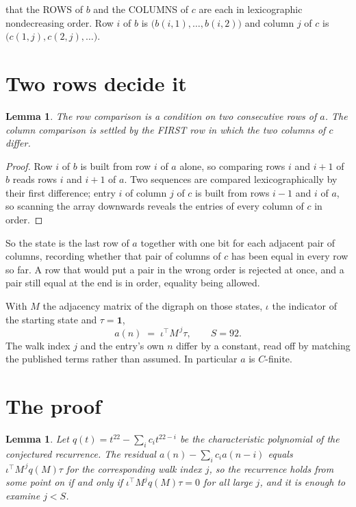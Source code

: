 \documentclass[11pt,a4paper]{article}
\theoremstyle{plain}
\newtheorem{lemma}[theorem]{Lemma}
\theoremstyle{definition}
\begin{document}
that the ROWS of $b$ and the COLUMNS of $c$ are each in lexicographic nondecreasing order. Row $i$ of $b$
is $\bigl(b(i,1),\dots,b(i,2)\bigr)$ and column $j$ of $c$ is
$\bigl(c(1,j),c(2,j),\dots\bigr)$.


\section{Two rows decide it}

\begin{lemma}\label{lem:win}
The row comparison is a condition on two consecutive rows of $a$. The column comparison is
settled by the FIRST row in which the two columns of $c$ differ.
\end{lemma}

\begin{proof}
Row $i$ of $b$ is built from row $i$ of $a$ alone, so comparing rows $i$ and $i+1$ of $b$ reads
rows $i$ and $i+1$ of $a$. Two sequences are compared lexicographically by their first
difference; entry $i$ of column $j$ of $c$ is built from rows $i-1$ and $i$ of $a$, so scanning
the array downwards reveals the entries of every column of $c$ in order.
\end{proof}

So the state is the last row of $a$ together with one bit for each adjacent pair of columns,
recording whether that pair of columns of $c$ has been equal in every row so far. A row that
would put a pair in the wrong order is rejected at once, and a pair still equal at the end is
in order, equality being allowed.

With $M$ the adjacency matrix of the digraph on those states, $\iota$ the indicator of the
starting state and $\tau=\mathbf{1}$,
\[
a(n)\;=\;\iota^{\!\top}M^{\,j}\tau ,\qquad S=92.
\]
The walk index $j$ and the entry's own $n$ differ by a constant, read off by matching the
published terms rather than assumed. In particular $a$ is $C$-finite.

\section{The proof}

\begin{lemma}\label{lem:crit}
Let $q(t)=t^{22}-\sum_i c_it^{22-i}$ be the characteristic polynomial of the
conjectured recurrence. The residual $a(n)-\sum_ic_ia(n-i)$ equals
$\iota^{\!\top}M^{\,j}q(M)\tau$ for the corresponding walk index $j$, so the recurrence
holds from some point on if and only if $\iota^{\!\top}M^{j}q(M)\tau=0$ for all large $j$,
and it is enough to examine $j<S$.
\end{lemma}
\end{document}
